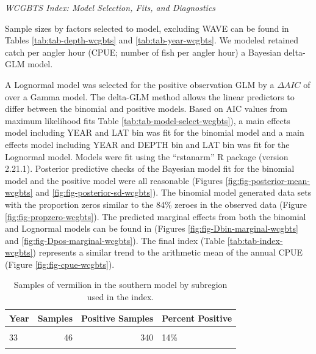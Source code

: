 \documentclass[
  english,
  a4paper,
]{article}
\begin{document}
\emph{WCGBTS Index: Model Selection, Fits, and Diagnostics}

Sample sizes by factors selected to model, excluding WAVE can be found in Tables
\ref{tab:tab-depth-wcgbts} and \ref{tab:tab-year-wcgbts}.
We modeled retained catch per angler hour (CPUE; number of fish per angler hour)
a Bayesian delta-GLM model.

A Lognormal model was
selected for the positive observation GLM by
a \(\Delta AIC\) of\\
over a Gamma model.
The delta-GLM
method allows the linear predictors to differ between the binomial and positive models.
Based on AIC values from maximum likelihood fits Table \ref{tab:tab-model-select-wcgbts}),
a main effects model including
YEAR and LAT bin
was fit for the binomial model and a main
effects model including
YEAR and DEPTH bin and LAT bin
was fit for the Lognormal model.
Models were fit using the ``rstanarm'' R package (version 2.21.1). Posterior predictive
checks of the Bayesian model fit for the binomial model and the positive model
were all reasonable (Figures \ref{fig:fig-posterior-mean-wcgbts} and
\ref{fig:fig-posterior-sd-wcgbts}). The binomial model generated data sets with the
proportion zeros similar to the 84\% zeroes in the observed data
(Figure \ref{fig:fig-propzero-wcgbts}). The predicted marginal effects from
both the binomial and Lognormal models can be found in (Figures \ref{fig:fig-Dbin-marginal-wcgbts} and \ref{fig:fig-Dpos-marginal-wcgbts}). The
final index (Table \ref{tab:tab-index-wcgbts})
represents a similar trend to the arithmetic mean of the annual CPUE (Figure \ref{fig:fig-cpue-wcgbts}).

\newpage

\begin{table}

\caption{\label{tab:tab-region-wcgbts}Samples of vermilion in the southern model by subregion used in the index.}
\centering
\begin{tabular}[t]{lrrl}
\toprule
Year & Samples & Positive Samples & Percent Positive\\
\midrule
\cellcolor{gray!6}{32} & \cellcolor{gray!6}{14} & \cellcolor{gray!6}{64} & \cellcolor{gray!6}{22\%}\\
33 & 46 & 340 & 14\%\\
\cellcolor{gray!6}{34} & \cellcolor{gray!6}{58} & \cellcolor{gray!6}{339} & \cellcolor{gray!6}{17\%}\\
\bottomrule
\end{tabular}
\end{table}
\end{document}
